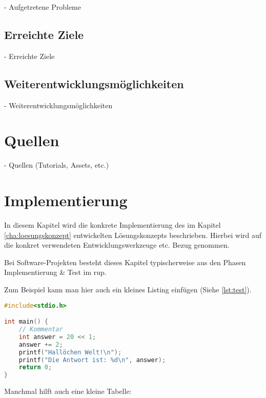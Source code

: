 \documentclass[oneside]{ausarbeitung}
\begin{document}
  - Aufgetretene Probleme


\section{Erreichte Ziele}

  - Erreichte Ziele


\section{Weiterentwicklungsmöglichkeiten}

  - Weiterentwicklungsmöglichkeiten


\chapter{Quellen}

- Quellen (Tutorials, Assets, etc.)












\chapter{Implementierung}
\label{cha:implementierung}

In diesem Kapitel wird die konkrete Implementierung des im Kapitel
\ref{cha:loesungskonzept} entwickelten Lösungskonzepts beschrieben.
Hierbei wird auf die konkret verwendeten Entwicklungswerkzeuge etc. 
Bezug genommen.

Bei Software-Projekten besteht dieses Kapitel typischerweise aus den 
Phasen Implementierung \& Test im \ac{rup}.

Zum Beispiel kann man hier auch ein kleines Listing einfügen (Siehe \ref{lst:test}).

\begin{lstlisting}[language=c,%
                   caption={Überschrift des Quelltexts},label=lst:test]
#include<stdio.h>

int main() {
    // Kommentar
    int answer = 20 << 1;
    answer += 2;
    printf("Hallöchen Welt!\n");
    printf("Die Antwort ist: %d\n", answer);
    return 0;
}
\end{lstlisting}

Manchmal hilft auch eine kleine Tabelle:
\end{document}
